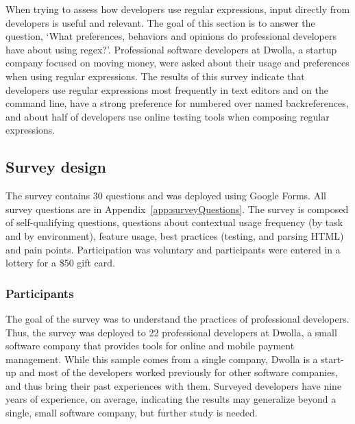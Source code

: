 When trying to assess how developers use regular expressions, input directly from developers is useful and relevant.  The goal of this section is to answer the question, `What preferences, behaviors and opinions do professional developers have about using regex?'.  Professional software developers at Dwolla, a startup company focused on moving money, were asked about their usage and preferences when using regular expressions.  The results of this survey indicate that developers use regular expressions most frequently in text editors and on the command line, have a strong preference for numbered over named backreferences, and about half of developers use online testing tools when composing regular expressions.

\subsection{Survey design}

The survey contains 30 questions and was deployed using Google Forms.
All survey questions are in Appendix~\ref{app:surveyQuestions}. The survey is composed of self-qualifying questions, questions about contextual usage frequency (by task and by environment), feature usage, best practices (testing, and parsing HTML) and pain points.  Participation was voluntary and participants were entered in a lottery for a \$50 gift card.


\subsubsection{Participants}
The goal of the survey was to understand the practices of professional developers. Thus, the survey was deployed to 22 professional developers at Dwolla, a small software company that provides tools for online and mobile payment management. While this sample comes from a single company, Dwolla is a start-up and most of the developers worked previously for other software companies, and thus bring their past experiences with them. Surveyed developers have nine years of experience, on average, indicating the results may generalize beyond a single, small software company, but further study is needed.
